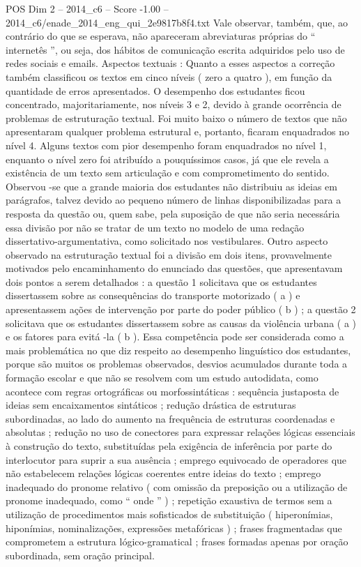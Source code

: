 \begin{textsample}{POS Dim 2 – 2014\_c6 – Score -1.00 – 2014\_c6/enade\_2014\_eng\_qui\_2e9817b8f4.txt}
Vale observar, também, que, ao contrário do que se esperava, não apareceram abreviaturas próprias do “ internetês ”, ou seja, dos hábitos de comunicação escrita adquiridos pelo uso de redes sociais e emails.
Aspectos textuais : Quanto a esses aspectos a correção também classificou os textos em cinco níveis ( zero a quatro ), em função da quantidade de erros apresentados.
O desempenho dos estudantes ficou concentrado, majoritariamente, nos níveis 3 e 2, devido à grande ocorrência de problemas de estruturação textual.
Foi muito baixo o número de textos que não apresentaram qualquer problema estrutural e, portanto, ficaram enquadrados no nível 4.
Alguns textos com pior desempenho foram enquadrados no nível 1, enquanto o nível zero foi atribuído a pouquíssimos casos, já que ele revela a existência de um texto sem articulação e com comprometimento do sentido.
Observou -se que a grande maioria dos estudantes não distribuiu as ideias em parágrafos, talvez devido ao pequeno número de linhas disponibilizadas para a resposta da questão ou, quem sabe, pela suposição de que não seria necessária essa divisão por não se tratar de um texto no modelo de uma redação dissertativo-argumentativa, como solicitado nos vestibulares.
Outro aspecto observado na estruturação textual foi a divisão em dois itens, provavelmente motivados pelo encaminhamento do enunciado das questões, que apresentavam dois pontos a serem detalhados : a questão 1 solicitava que os estudantes dissertassem sobre as consequências do transporte motorizado ( a ) e apresentassem ações de intervenção por parte do poder público ( b ) ; a questão 2 solicitava que os estudantes dissertassem sobre as causas da violência urbana ( a ) e os fatores para evitá -la ( b ).
Essa competência pode ser considerada como a mais problemática no que diz respeito ao desempenho linguístico dos estudantes, porque são muitos os problemas observados, desvios acumulados durante toda a formação escolar e que não se resolvem com um estudo autodidata, como acontece com regras ortográficas ou morfossintáticas : sequência justaposta de ideias sem encaixamentos sintáticos ; redução drástica de estruturas subordinadas, ao lado do aumento na frequência de estruturas coordenadas e absolutas ; redução no uso de conectores para expressar relações lógicas essenciais à construção do texto, substituídas pela exigência de inferência por parte do interlocutor para suprir a sua ausência ; emprego equivocado de operadores que não estabelecem relações lógicas coerentes entre ideias do texto ; emprego inadequado do pronome relativo ( com omissão da preposição ou a utilização de pronome inadequado, como “ onde ” ) ; repetição exaustiva de termos sem a utilização de procedimentos mais sofisticados de substituição ( hiperonímias, hiponímias, nominalizações, expressões metafóricas ) ; frases fragmentadas que comprometem a estrutura lógico-gramatical ; frases formadas apenas por oração subordinada, sem oração principal.

\end{textsample}
